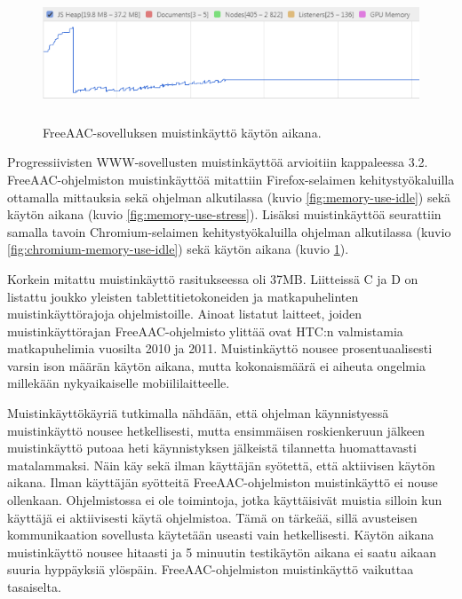 \documentclass[utf8]{gradu3}
\begin{document}
\begin{figure}[h]\centering
  \includegraphics[height=4cm,keepaspectratio]{chromium-memory-use-stress}
  \caption[FreeAAC-sovelluksen muistinkäyttö käytön aikana graafina.]
  {FreeAAC-sovelluksen muistinkäyttö käytön aikana.}
  \label{fig:chromium-memory-use-stress}
\end{figure}

Progressiivisten WWW-sovellusten muistinkäyttöä arvioitiin kappaleessa 3.2. FreeAAC\nobreakdash-\hspace{0pt}ohjelmiston muistinkäyttöä mitattiin Firefox-selaimen kehitystyökaluilla ottamalla mittauksia sekä ohjelman alkutilassa (kuvio \ref{fig:memory-use-idle}) sekä käytön aikana (kuvio \ref{fig:memory-use-stress}). Lisäksi muistinkäyttöä seurattiin samalla tavoin Chromium-selaimen kehitystyökaluilla ohjelman alkutilassa (kuvio \ref{fig:chromium-memory-use-idle}) sekä käytön aikana (kuvio \ref{fig:chromium-memory-use-stress}). 

Korkein mitattu muistinkäyttö rasitukseessa oli 37MB. Liitteissä C ja D on listattu joukko yleisten tablettitietokoneiden ja matkapuhelinten muistinkäyttörajoja ohjelmistoille. Ainoat listatut laitteet, joiden muistinkäyttörajan FreeAAC-ohjelmisto ylittää ovat HTC:n valmistamia matkapuhelimia vuosilta 2010 ja 2011. Muistinkäyttö nousee prosentuaalisesti varsin ison määrän käytön aikana, mutta kokonaismäärä ei aiheuta ongelmia millekään nykyaikaiselle mobiililaitteelle.

Muistinkäyttökäyriä tutkimalla nähdään, että ohjelman käynnistyessä muistinkäyttö nousee hetkellisesti, mutta ensimmäisen roskienkeruun jälkeen muistinkäyttö putoaa heti käynnistyksen jälkeistä tilannetta huomattavasti matalammaksi. Näin käy sekä ilman käyttäjän syötettä, että aktiivisen käytön aikana. Ilman käyttäjän syötteitä FreeAAC-ohjelmiston muistinkäyttö ei nouse ollenkaan. Ohjelmistossa ei ole toimintoja, jotka käyttäisivät muistia silloin kun käyttäjä ei aktiivisesti käytä ohjelmistoa. Tämä on tärkeää, sillä avusteisen kommunikaation sovellusta käytetään useasti vain hetkellisesti. Käytön aikana muistinkäyttö nousee hitaasti ja 5 minuutin testikäytön aikana ei saatu aikaan suuria hyppäyksiä ylöspäin. FreeAAC-ohjelmiston muistinkäyttö vaikuttaa tasaiselta.
\end{document}
